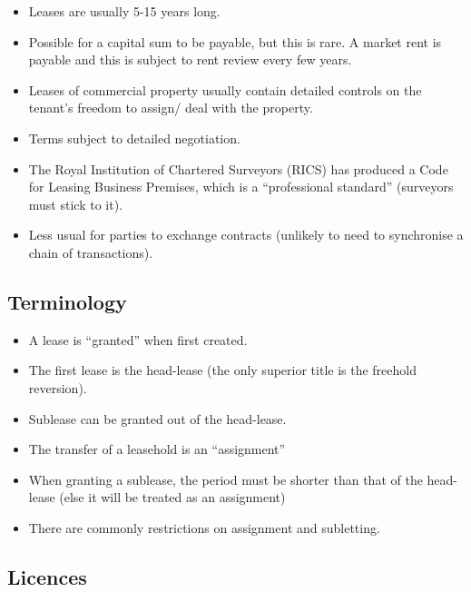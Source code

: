 \documentclass[
]{article}
\providecommand{\tightlist}{%
  \setlength{\itemsep}{0pt}\setlength{\parskip}{0pt}}
\begin{document}
\begin{itemize}
\tightlist
\item
  Leases are usually 5-15 years long.
\item
  Possible for a capital sum to be payable, but this is rare. A market
  rent is payable and this is subject to rent review every few years.
\item
  Leases of commercial property usually contain detailed controls on the
  tenant's freedom to assign/ deal with the property.
\item
  Terms subject to detailed negotiation.
\item
  The Royal Institution of Chartered Surveyors (RICS) has produced a
  Code for Leasing Business Premises, which is a ``professional
  standard'' (surveyors must stick to it).
\item
  Less usual for parties to exchange contracts (unlikely to need to
  synchronise a chain of transactions).
\end{itemize}

\hypertarget{terminology}{%
\subsection{Terminology}\label{terminology}}

\begin{itemize}
\tightlist
\item
  A lease is ``granted'' when first created.
\item
  The first lease is the head-lease (the only superior title is the
  freehold reversion).
\item
  Sublease can be granted out of the head-lease.
\item
  The transfer of a leasehold is an ``assignment''
\item
  When granting a sublease, the period must be shorter than that of the
  head-lease (else it will be treated as an assignment)
\item
  There are commonly restrictions on assignment and subletting.
\end{itemize}

\hypertarget{licences}{%
\subsection{Licences}\label{licences}}
\end{document}
